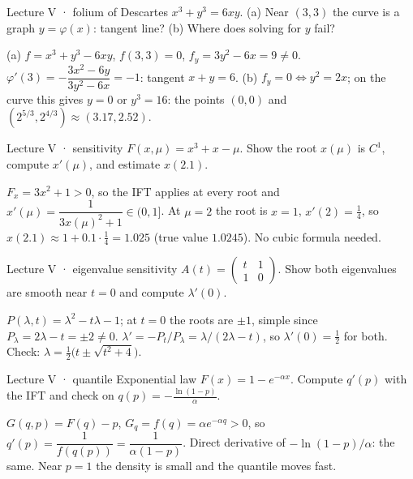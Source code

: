 \begin{problem}{Lecture V · folium of Descartes}
$x^3+y^3=6xy$. (a) Near $(3,3)$ the curve is a graph $y=\varphi(x)$: tangent line? (b) Where does
solving for $y$ fail?
\end{problem}
\begin{solution}
(a) $f=x^3+y^3-6xy$, $f(3,3)=0$, $f_y=3y^2-6x=9\ne0$. $\varphi'(3)=-\dfrac{3x^2-6y}{3y^2-6x}=-1$:
tangent $x+y=6$.
(b) $f_y=0\iff y^2=2x$; on the curve this gives $y=0$ or $y^3=16$: the points $(0,0)$ and
$(2^{5/3},2^{4/3})\approx(3.17,2.52)$.
\end{solution}

\begin{problem}{Lecture V · sensitivity}
$F(x,\mu)=x^3+x-\mu$. Show the root $x(\mu)$ is $C^1$, compute $x'(\mu)$, and estimate $x(2.1)$.
\end{problem}
\begin{solution}
$F_x=3x^2+1>0$, so the IFT applies at every root and $x'(\mu)=\dfrac1{3x(\mu)^2+1}\in(0,1]$. At
$\mu=2$ the root is $x=1$, $x'(2)=\tfrac14$, so $x(2.1)\approx1+0.1\cdot\tfrac14=1.025$ (true value
$1.0245$). No cubic formula needed.
\end{solution}

\begin{problem}{Lecture V · eigenvalue sensitivity}
$A(t)=\begin{pmatrix}t&1\\1&0\end{pmatrix}$. Show both eigenvalues are smooth near $t=0$ and compute $\lambda'(0)$.
\end{problem}
\begin{solution}
$P(\lambda,t)=\lambda^2-t\lambda-1$; at $t=0$ the roots are $\pm1$, simple since
$P_\lambda=2\lambda-t=\pm2\ne0$. $\lambda'=-P_t/P_\lambda=\lambda/(2\lambda-t)$, so $\lambda'(0)=\tfrac12$ for both.
Check: $\lambda=\tfrac12\big(t\pm\sqrt{t^2+4}\big)$.
\end{solution}

\begin{problem}{Lecture V · quantile}
Exponential law $F(x)=1-e^{-\alpha x}$. Compute $q'(p)$ with the IFT and check on $q(p)=-\frac{\ln(1-p)}{\alpha}$.
\end{problem}
\begin{solution}
$G(q,p)=F(q)-p$, $G_q=f(q)=\alpha e^{-\alpha q}>0$, so $q'(p)=\dfrac1{f(q(p))}=\dfrac1{\alpha(1-p)}$. Direct
derivative of $-\ln(1-p)/\alpha$: the same. Near $p=1$ the density is small and the quantile
moves fast.
\end{solution}

